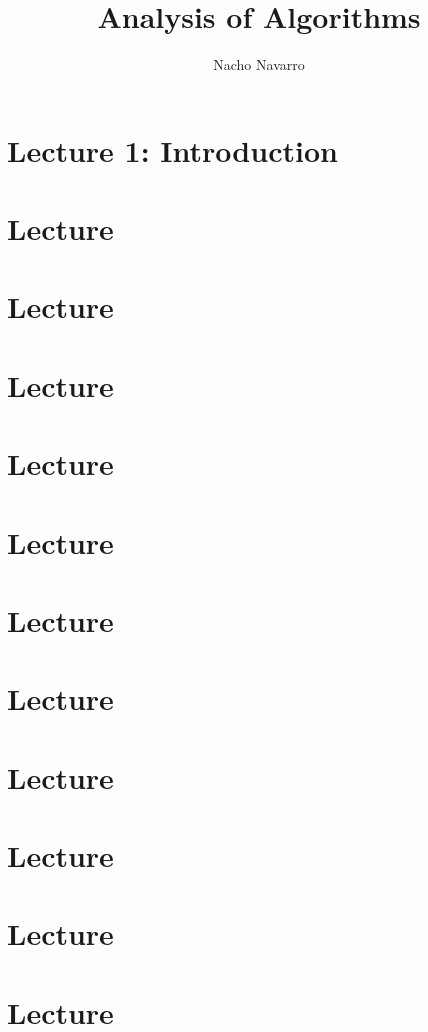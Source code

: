 \documentclass{easyclass}
\begin{document}
\begin{titlepage}
    \title{Analysis of Algorithms}
    \author{Nacho Navarro}
    \maketitle
\end{titlepage}

\tableofcontents

\chapter{Lecture 1: Introduction}


\chapter{Lecture}


\chapter{Lecture}


\chapter{Lecture}


\chapter{Lecture}


\chapter{Lecture}


\chapter{Lecture}


\chapter{Lecture}


\chapter{Lecture}


\chapter{Lecture}


\chapter{Lecture}


\chapter{Lecture}



%
\end{document}
